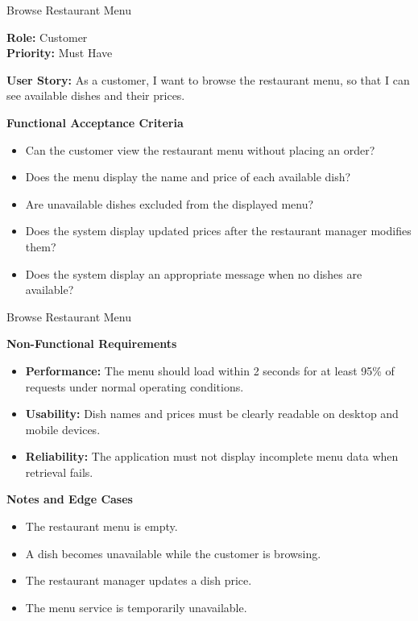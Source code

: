 
\begin{frame}{Browse Restaurant Menu}

\noindent\textbf{Role:} Customer\\
\textbf{Priority:} Must Have

\textbf{User Story:} As a customer, I want to browse the restaurant menu, so that I can see available dishes and their prices.

\textbf{Functional Acceptance Criteria}
\begin{itemize}
  \item Can the customer view the restaurant menu without placing an order?
  \item Does the menu display the name and price of each available dish?
  \item Are unavailable dishes excluded from the displayed menu?
  \item Does the system display updated prices after the restaurant manager modifies them?
  \item Does the system display an appropriate message when no dishes are available?
\end{itemize}

\end{frame}

\begin{frame}{Browse Restaurant Menu}

\textbf{Non-Functional Requirements}
\begin{itemize}
  \item \textbf{Performance:} The menu should load within 2 seconds for at least 95\% of requests under normal operating conditions.
  \item \textbf{Usability:} Dish names and prices must be clearly readable on desktop and mobile devices.
  \item \textbf{Reliability:} The application must not display incomplete menu data when retrieval fails.
\end{itemize}

\textbf{Notes and Edge Cases}
\begin{itemize}
  \item The restaurant menu is empty.
  \item A dish becomes unavailable while the customer is browsing.
  \item The restaurant manager updates a dish price.
  \item The menu service is temporarily unavailable.
\end{itemize}

\end{frame}
